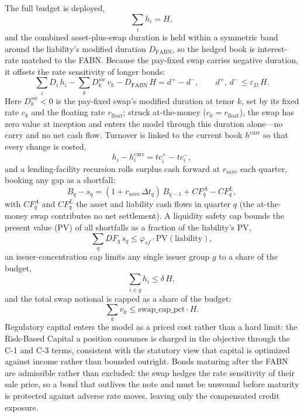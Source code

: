 \documentclass[12pt]{article}
\begin{document}
The full budget is deployed,
\begin{equation}
\sum_i h_i = H,
\end{equation}
and the combined asset-plus-swap duration is held within a symmetric band around the liability's modified duration $D_{\text{FABN}}$, so the hedged book is interest-rate matched to the FABN. Because the pay-fixed swap carries negative duration, it offsets the rate sensitivity of longer bonds:
\begin{equation}
\sum_i D_i\,h_i - \sum_k D^{sw}_k\,v_k - D_{\text{FABN}}\,H = d^{+} - d^{-}, \qquad d^{+},\,d^{-} \le \varepsilon_D\,H.
\end{equation}
Here $D^{sw}_k < 0$ is the pay-fixed swap's modified duration at tenor $k$, set by its fixed rate $c_k$ and the floating rate $r_{\text{float}}$; struck at-the-money ($c_k = r_{\text{float}}$), the swap has zero value at inception and enters the model through this duration alone---no carry and no net cash flow. Turnover is linked to the current book $h^{\text{curr}}$ so that every change is costed,
\begin{equation}
h_i - h^{\text{curr}}_i = tc^{+}_i - tc^{-}_i,
\end{equation}
and a lending-facility recursion rolls surplus cash forward at $r_{\text{save}}$ each quarter, booking any gap as a shortfall:
\begin{equation}
B_q - s_q = (1 + r_{\text{save}}\,\Delta t_q)\,B_{q-1} + CF^{A}_q - CF^{L}_q,
\end{equation}
with $CF^{A}_q$ and $CF^{L}_q$ the asset and liability cash flows in quarter $q$ (the at-the-money swap contributes no net settlement). A liquidity safety cap bounds the present value (PV) of all shortfalls as a fraction of the liability's PV,
\begin{equation}
\sum_q DF_q\,s_q \le \varphi_{sf}\cdot \text{PV}(\text{liability}),
\end{equation}
an issuer-concentration cap limits any single issuer group $g$ to a share of the budget,
\begin{equation}
\sum_{i \in g} h_i \le \delta\,H,
\end{equation}
and the total swap notional is capped as a share of the budget:
\begin{equation}
\sum_k v_k \le \text{swap\_cap\_pct}\cdot H.
\end{equation}
Regulatory capital enters the model as a priced cost rather than a hard limit: the Risk-Based Capital a position consumes is charged in the objective through the C-1 and C-3 terms, consistent with the statutory view that capital is optimized against income rather than bounded outright. Bonds maturing after the FABN are admissible rather than excluded: the swap hedges the rate sensitivity of their sale price, so a bond that outlives the note and must be unwound before maturity is protected against adverse rate moves, leaving only the compensated credit exposure.
\end{document}

